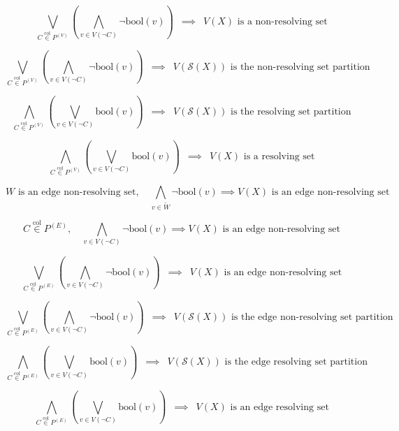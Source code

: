 \documentclass{article}
\begin{document}
\[ \bigvee \limits_{\displaystyle C \overset{\mathrm{col}}{\in} P^{(V)}} \left( \bigwedge \limits_{\displaystyle v \in V(\neg C)} \neg \mathrm{bool}(v) \right)\enspace \implies\enspace V(X) \text{ is a non-resolving set} \]

\[ \bigvee \limits_{\displaystyle C \overset{\mathrm{col}}{\in} P^{(V)}} \left( \bigwedge \limits_{\displaystyle v \in V(\neg C)} \neg \mathrm{bool}(v) \right)\enspace \implies\enspace V(\mathcal{S}(X)) \text{ is the non-resolving set partition} \]

\[ \bigwedge \limits_{\displaystyle C \overset{\mathrm{col}}{\in} P^{(V)}} \left( \bigvee \limits_{\displaystyle v \in V(\neg C)} \mathrm{bool}(v) \right)\enspace \implies\enspace V(\mathcal{S}(X)) \text{ is the resolving set partition} \]

\[ \bigwedge \limits_{\displaystyle C \overset{\mathrm{col}}{\in} P^{(V)}} \left( \bigvee \limits_{\displaystyle v \in V(\neg C)} \mathrm{bool}(v) \right)\enspace \implies\enspace V(X) \text{ is a resolving set} \]

\[ W \text{ is an edge non-resolving set},\quad \bigwedge \limits_{\displaystyle v \in \widetilde{W}} \neg \mathrm{bool}(v) \implies V(X) \text{ is an edge non-resolving set} \]

\[ C \overset{\mathrm{col}}{\in} P^{(E)},\quad \bigwedge \limits_{\displaystyle v \in V(\neg C)} \neg \mathrm{bool}(v) \implies V(X) \text{ is an edge non-resolving set} \]

\[ \bigvee \limits_{\displaystyle C \overset{\mathrm{col}}{\in} P^{(E)}} \left( \bigwedge \limits_{\displaystyle v \in V(\neg C)} \neg \mathrm{bool}(v) \right)\enspace \implies\enspace V(X) \text{ is an edge non-resolving set} \]

\[ \bigvee \limits_{\displaystyle C \overset{\mathrm{col}}{\in} P^{(E)}} \left( \bigwedge \limits_{\displaystyle v \in V(\neg C)} \neg \mathrm{bool}(v) \right)\enspace \implies\enspace V(\mathcal{S}(X)) \text{ is the edge non-resolving set partition} \]

\[ \bigwedge \limits_{\displaystyle C \overset{\mathrm{col}}{\in} P^{(E)}} \left( \bigvee \limits_{\displaystyle v \in V(\neg C)} \mathrm{bool}(v) \right)\enspace \implies\enspace V(\mathcal{S}(X)) \text{ is the edge resolving set partition} \]

\[ \bigwedge \limits_{\displaystyle C \overset{\mathrm{col}}{\in} P^{(E)}} \left( \bigvee \limits_{\displaystyle v \in V(\neg C)} \mathrm{bool}(v) \right)\enspace \implies\enspace V(X) \text{ is an edge resolving set} \]
\end{document}
